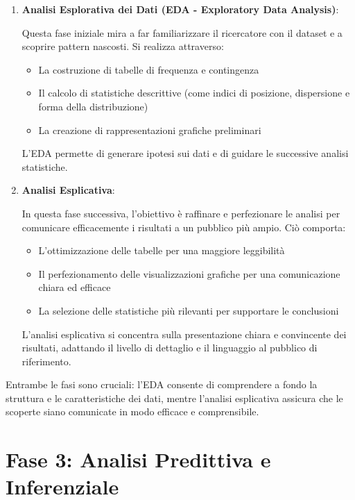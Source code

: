 \documentclass[
  letterpaper,
  DIV=11,
  numbers=noendperiod]{scrreprt}
\providecommand{\tightlist}{%
  \setlength{\itemsep}{0pt}\setlength{\parskip}{0pt}}\usepackage{longtable,booktabs,array}
\theoremstyle{definition}
\theoremstyle{remark}
\begin{document}
\begin{enumerate}
\def\labelenumi{\arabic{enumi}.}
\item
  \textbf{Analisi Esplorativa dei Dati (EDA - Exploratory Data
  Analysis)}:

  Questa fase iniziale mira a far familiarizzare il ricercatore con il
  dataset e a scoprire pattern nascosti. Si realizza attraverso:

  \begin{itemize}
  \tightlist
  \item
    La costruzione di tabelle di frequenza e contingenza
  \item
    Il calcolo di statistiche descrittive (come indici di posizione,
    dispersione e forma della distribuzione)
  \item
    La creazione di rappresentazioni grafiche preliminari
  \end{itemize}

  L'EDA permette di generare ipotesi sui dati e di guidare le successive
  analisi statistiche.
\item
  \textbf{Analisi Esplicativa}:

  In questa fase successiva, l'obiettivo è raffinare e perfezionare le
  analisi per comunicare efficacemente i risultati a un pubblico più
  ampio. Ciò comporta:

  \begin{itemize}
  \tightlist
  \item
    L'ottimizzazione delle tabelle per una maggiore leggibilità
  \item
    Il perfezionamento delle visualizzazioni grafiche per una
    comunicazione chiara ed efficace
  \item
    La selezione delle statistiche più rilevanti per supportare le
    conclusioni
  \end{itemize}

  L'analisi esplicativa si concentra sulla presentazione chiara e
  convincente dei risultati, adattando il livello di dettaglio e il
  linguaggio al pubblico di riferimento.
\end{enumerate}

Entrambe le fasi sono cruciali: l'EDA consente di comprendere a fondo la
struttura e le caratteristiche dei dati, mentre l'analisi esplicativa
assicura che le scoperte siano comunicate in modo efficace e
comprensibile.

\section{Fase 3: Analisi Predittiva e
Inferenziale}\label{fase-3-analisi-predittiva-e-inferenziale}
\end{document}

